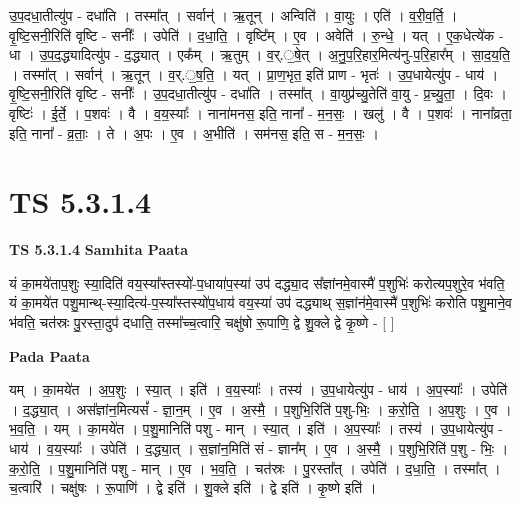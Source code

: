 \documentclass[17pt]{extarticle}
\begin{document}
उ॒प॒दधा॒तीत्यु॑प - दधा॑ति । तस्मा᳚त् । सर्वान्॑ । ऋ॒तून् । अन्विति॑ । वा॒युः । एति॑ । व॒री॒व॒र्ति॒ । वृ॒ष्टि॒सनी॒रिति॑ वृष्टि - सनीः᳚ । उपेति॑ । द॒धा॒ति॒ । वृष्टि᳚म् । ए॒व । अवेति॑ । रु॒न्धे॒ । यत् । ए॒क॒धेत्ये॑क - धा । उ॒प॒द॒द्ध्यादित्यु॑प - द॒द्ध्यात् । एक᳚म् । ऋ॒तुम् । व॒र्.॒षे॒त् । अ॒नु॒प॒रि॒हार॒मित्य॑नु-प॒रि॒हार᳚म् । सा॒द॒य॒ति॒ । तस्मा᳚त् । सर्वान्॑ । ऋ॒तून् । व॒र्.॒ष॒ति॒ । यत् । प्रा॒ण॒भृत॒ इति॑ प्राण - भृतः॑ । उ॒प॒धायेत्यु॑प - धाय॑ । वृ॒ष्टि॒सनी॒रिति॑ वृष्टि - सनीः᳚ । उ॒प॒दधा॒तीत्यु॑प - दधा॑ति । तस्मा᳚त् । वा॒युप्र॑च्यु॒तेति॑ वा॒यु - प्र॒च्यु॒ता॒ । दि॒वः । वृष्टिः॑ । ई॒र्ते॒ । प॒शवः॑ । वै । व॒य॒स्याः᳚ । नाना॑मनस॒ इति॒ नाना᳚ - म॒न॒सः॒ । खलु॑ । वै । प॒शवः॑ । नाना᳚व्रता॒ इति॒ नाना᳚ - व्र॒ताः॒ । ते । अ॒पः । ए॒व । अ॒भीति॑ । सम॑नस॒ इति॒ स - म॒न॒सः॒ ।  \newline




\section*{ TS 5.3.1.4 }

\textbf{TS 5.3.1.4 } \newline
\textbf{Samhita Paata} \newline

यं का॒मये॑ताप॒शुः स्या॒दिति॑ वय॒स्या᳚स्तस्यो॑-प॒धाया॑प॒स्या॑ उप॑ दद्ध्या॒द स᳚ज्ञांनमे॒वास्मै॑ प॒शुभिः॑ करोत्यप॒शुरे॒व भ॑वति॒ यं का॒मये॑त पशु॒मान्थ्-स्या॒दित्य॑-प॒स्या᳚स्तस्यो॑प॒धाय॑ वय॒स्या॑ उप॑ दद्ध्याथ् स॒ज्ञांन॑मे॒वास्मै॑ प॒शुभिः॑ करोति पशु॒माने॒व भ॑वति॒ चत॑स्रः पु॒रस्ता॒दुप॑ दधाति॒ तस्मा᳚च्च॒त्वारि॒ चक्षु॑षो रू॒पाणि॒ द्वे शु॒क्ले द्वे कृ॒ष्णे - [  ] \newline

\textbf{Pada Paata} \newline

यम् । का॒मये॑त । अ॒प॒शुः । स्या॒त् । इति॑ । व॒य॒स्याः᳚ । तस्य॑ । उ॒प॒धायेत्यु॑प - धाय॑ । अ॒प॒स्याः᳚ । उपेति॑ । द॒द्ध्या॒त् । अस᳚ज्ञांन॒मित्यसं᳚ - ज्ञा॒न॒म् । ए॒व । अ॒स्मै॒ । प॒शुभि॒रिति॑ प॒शु-भिः॒ । क॒रो॒ति॒ । अ॒प॒शुः । ए॒व । भ॒व॒ति॒ । यम् । का॒मये॑त । प॒शु॒मानिति॑ पशु - मान् । स्या॒त् । इति॑ । अ॒प॒स्याः᳚ । तस्य॑ । उ॒प॒धायेत्यु॑प - धाय॑ । व॒य॒स्याः᳚ । उपेति॑ । द॒द्ध्या॒त् । स॒ज्ञांन॒मिति॑ सं - ज्ञान᳚म् । ए॒व । अ॒स्मै॒ । प॒शुभि॒रिति॑ प॒शु - भिः॒ । क॒रो॒ति॒ । प॒शु॒मानिति॑ पशु - मान् । ए॒व । भ॒व॒ति॒ । चत॑स्रः । पु॒रस्ता᳚त् । उपेति॑ । द॒धा॒ति॒ । तस्मा᳚त् । च॒त्वारि॑ । चक्षु॑षः । रू॒पाणि॑ । द्वे इति॑ । शु॒क्ले इति॑ । द्वे इति॑ । कृ॒ष्णे इति॑ ।  \newline
\end{document}
